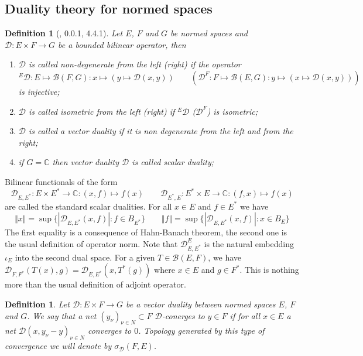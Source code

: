 \documentclass[12pt]{article}
\newtheorem{definition}[theorem]{Definition}
\begin{document}
\subsection{Duality theory for normed spaces}
\begin{definition}[\cite{HelQFA}, 0.0.1, 4.4.1]\label{DefDuality} Let $E$, $F$
and $G$ be normed spaces and $\mathcal{D}:E\times F\to G$ be a bounded bilinear
operator, then 
\begin{enumerate}[label = (\roman*)]
    \item $\mathcal{D}$ is called non-degenerate from the left 
    (right) if the operator 
    $$
    {}^E\mathcal{D}
    :E\mapsto\mathcal{B}(F,G)
    :x\mapsto(y\mapsto\mathcal{D}(x,y))\qquad
    (\mathcal{D}^F
    :F\mapsto\mathcal{B}(E,G)
    :y\mapsto(x\mapsto\mathcal{D}(x,y)))
    $$ 
    is injective;
    
    \item $\mathcal{D}$ is called isometric from the left 
    (right) if ${}^E\mathcal{D}$ ($\mathcal{D}^F$) is isometric;
    
    \item $\mathcal{D}$ is called a vector duality if it is 
    non degenerate from the left and from the right;
    
    \item if $G=\mathbb{C}$ then vector duality $\mathcal{D}$ 
    is called scalar duality; 
\end{enumerate}
\end{definition}
Bilinear functionals of the form
$$
\mathcal{D}_{E,E^*}:E\times E^*\to\mathbb{C}:(x,f)\mapsto f(x)
\qquad
\mathcal{D}_{E^*,E}:E^*\times E\to\mathbb{C}:(f,x)\mapsto f(x)
$$
are called the standard scalar dualities. For all $x\in E$ and $f\in E^*$ we
have
$$
\Vert x\Vert=\sup \{|\mathcal{D}_{E,E^*}(x,f)|:f\in B_{E^*} \}
\qquad
\Vert f\Vert=\sup \{|\mathcal{D}_{E,E^*}(x,f)|:x\in  B_E \} 
$$
The first equality is a consequence of Hahn-Banach theorem, the second one is
the usual definition of operator norm. Note that $\mathcal{D}_{E,E^*}^E$ is the
natural embedding $\iota_E$ into the second dual space. For a given $T\in
\mathcal{B}(E,F)$, we have
$\mathcal{D}_{F,F^*}(T(x),g)=\mathcal{D}_{E,E^*}(x,T^*(g))$ where $x\in E$ and
$g\in F^*$. This is nothing more than the usual definition of adjoint operator.

\begin{definition}\label{DefDConv} Let $\mathcal{D}:E\times F\to G$ be a vector
duality between normed spaces $E$, $F$ and $G$. We say that a net
${(y_\nu)}_{\nu\in N}\subset F$ $\mathcal{D}$-conerges to $y\in F$ if for all
$x\in E$ a net ${\mathcal{D}(x,y_\nu-y)}_{\nu\in N}$ converges to $0$. Topology
generated by this type of convergence we will denote by
$\sigma_\mathcal{D}(F,E)$.
\end{definition}
\end{document}
